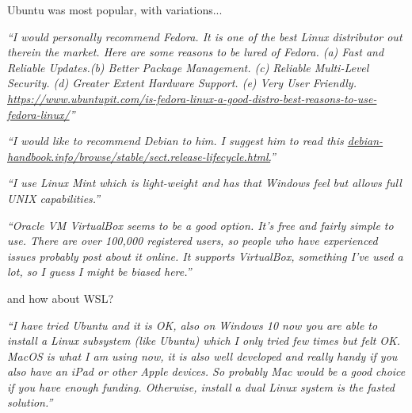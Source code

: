 \documentclass[12pt]{beamer}
\newcommand\ans[1]{{\it ``#1''}}
\newcommand\gap{\vspace{5mm}}
\begin{document}
\begin{frame}

  Ubuntu was most popular, with variations...

  \gap
  
\ans{I would personally recommend Fedora.  It is one of the best Linux distributor out therein the market.  Here are some reasons to be lured of Fedora. (a)  Fast and Reliable Updates.(b)  Better Package Management. (c)  Reliable Multi-Level Security. (d)  Greater Extent Hardware Support. (e)  Very User Friendly.
  \url{https://www.ubuntupit.com/is-fedora-linux-a-good-distro-best-reasons-to-use-fedora-linux/}}

\gap

\ans{I  would  like  to  recommend  Debian  to  him.   I  suggest  him  to  read  this \url{debian-handbook.info/browse/stable/sect.release-lifecycle.html.}}

\gap

\ans{I use Linux Mint which is light-weight and has that Windows feel but allows full UNIX capabilities.}

\end{frame}

\begin{frame}
  
\ans{Oracle VM VirtualBox seems to be a good option.  It's free and fairly simple to use. There are over 100,000 registered users, so people who have experienced issues probably post about it online.  It supports VirtualBox, something I’ve used a lot, so I guess I might be biased here.}

\end{frame}

\begin{frame}

  and how about WSL?

  \gap
  
  \ans{I have tried Ubuntu and it is OK, also on Windows 10 now you are able to install a Linux subsystem (like Ubuntu) which I only tried few times but felt OK. MacOS is what I am using now, it is also well developed and really handy if you also have an iPad  or  other  Apple  devices.   So  probably  Mac  would  be  a  good  choice  if  you  have enough funding.  Otherwise, install a dual Linux system is the fasted solution.}
  
\end{frame}
\end{document}
